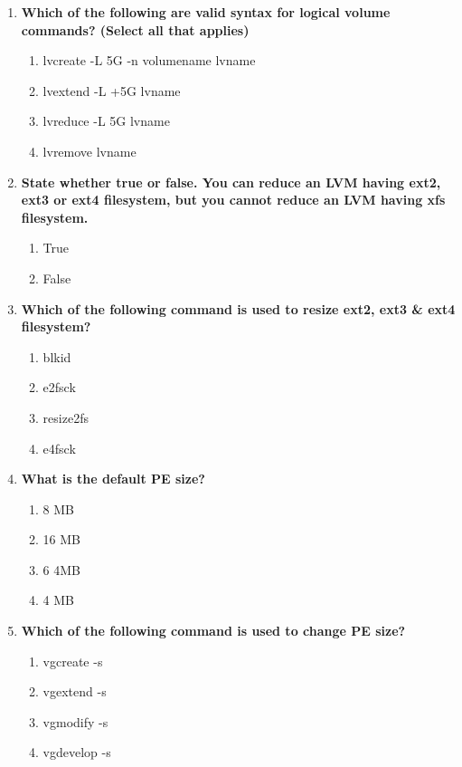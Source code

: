 \begin{flushleft}
\begin{enumerate}
		\item \textbf{Which of the following are valid syntax for logical volume commands? (Select all that applies)}
		\begin{enumerate}[label=(\alph*)]
			\item lvcreate -L 5G -n volumename  lvname  %
			\item lvextend -L +5G  lvname  %
			\item lvreduce -L 5G  lvname  %
			\item lvremove lvname  %
		\end{enumerate}
		\bigskip
		\bigskip	
		\newpage
		\item \textbf{State whether true or false. You can reduce an LVM having ext2, ext3 or ext4 filesystem, but you cannot reduce an LVM having xfs filesystem.}
		\begin{enumerate}[label=(\alph*)]
			\item True %
			\item False
		\end{enumerate}
		\bigskip
		\bigskip
		

		\item \textbf{Which of the following command is used to resize ext2, ext3 \& ext4 filesystem?}
		\begin{enumerate}[label=(\alph*)]
			\item blkid
			\item e2fsck
			\item resize2fs   %
			\item e4fsck
		\end{enumerate}
		\bigskip
		\bigskip	


		\item \textbf{What is the default PE size?}
		\begin{enumerate}[label=(\alph*)]
			\item 8 MB
			\item 16 MB
			\item 6 4MB
			\item 4 MB   %
		\end{enumerate}
		\bigskip
		\bigskip	

		\item \textbf{Which of the following command is used to change PE size?}
		\begin{enumerate}[label=(\alph*)]
			\item vgcreate -s  %
			\item vgextend -s  
			\item vgmodify -s 
			\item vgdevelop -s  %
		\end{enumerate}

	\end{enumerate}
	
\end{flushleft}


